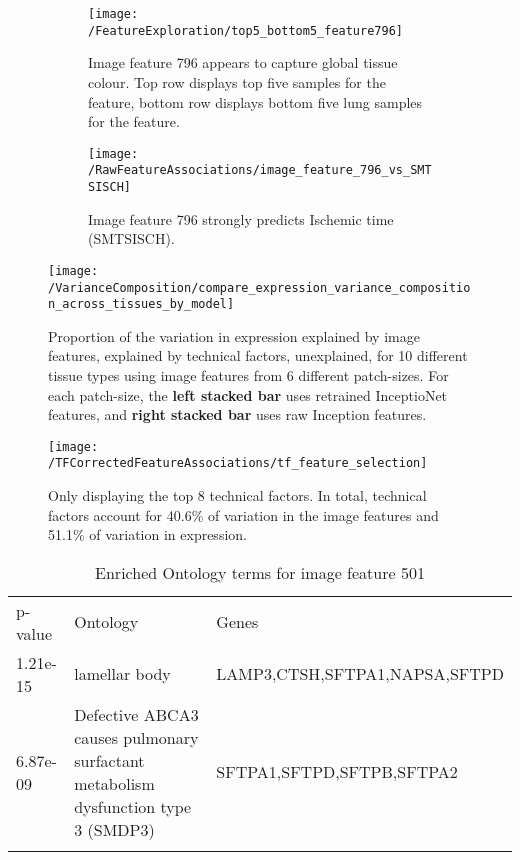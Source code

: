 \documentclass{article}
\begin{document}
\begin{figure}[h]
\begin{subfigure}{0.6\textwidth}
    \centering
    \texttt{[image: /FeatureExploration/top5\_bottom5\_feature796]}
    \caption{Image feature 796 appears to capture global tissue colour. Top row displays top five samples for the feature, bottom row displays bottom five lung samples for the feature.}
    \label{fig:top5_bottom5_feature796}
\end{subfigure}
\begin{subfigure}{0.3\textwidth}
    \centering
    \texttt{[image: /RawFeatureAssociations/image\_feature\_796\_vs\_SMTSISCH]}
    \caption{Image feature 796 strongly predicts Ischemic time (SMTSISCH).}
    \label{fig:image_feature_796_vs_SMTSISCH}
 \end{subfigure}
 \caption{}
\end{figure}



\begin{figure}[h]
  \centering
    \texttt{[image: /VarianceComposition/compare\_expression\_variance\_composition\_across\_tissues\_by\_model]} 
  \caption{Proportion of the variation in expression \textcolor{figgreen}{explained by image features}, \textcolor{figpurple}{explained by technical factors}, \textcolor{figorange}{unexplained}, for 10 different tissue types using image features from 6 different patch-sizes. For each patch-size, the \textbf{left stacked bar} uses retrained InceptioNet features, and \textbf{right stacked bar} uses raw Inception features.}
  \label{fig:variance_composition}
\end{figure}

\begin{figure}[H]
    \centering
      \texttt{[image: /TFCorrectedFeatureAssociations/tf\_feature\_selection]} 
        \caption{Only displaying the top 8 technical factors. In total, technical factors account for 40.6\% of variation in the image features and 51.1\% of variation in expression.}
        \label{fig:tf_feature_selection}
\end{figure}


\begin{table}[H]
\caption{Enriched Ontology terms for image feature 501}
\label{tab:image_feature_pcs_and_tfs}       %

\begin{tabular}{p{2cm}p{6cm}p{6cm}}
\hline\noalign{\smallskip}
p-value & Ontology & Genes  \\
1.21e-15 & lamellar body & LAMP3,CTSH,SFTPA1,NAPSA,SFTPD  \\
6.87e-09 & Defective ABCA3 causes pulmonary surfactant metabolism dysfunction type 3 (SMDP3) & SFTPA1,SFTPD,SFTPB,SFTPA2 \\


\noalign{\smallskip}\hline\noalign{\smallskip}
\end{tabular}
\end{table}
\end{document}
